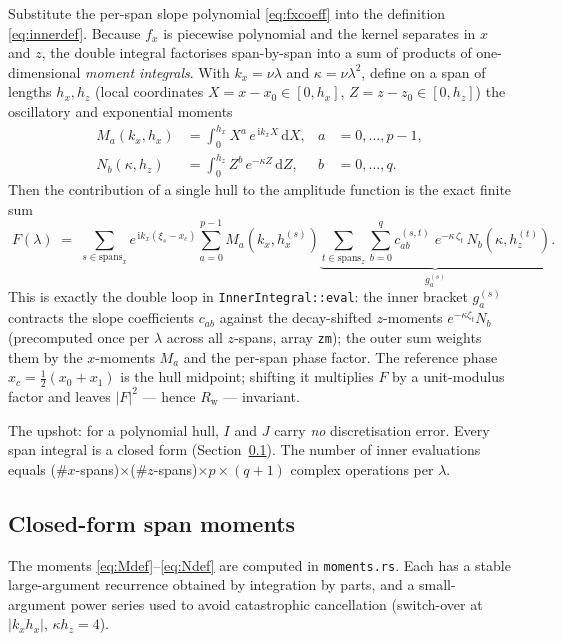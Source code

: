 \documentclass[11pt]{article}
\newcommand{\ii}{\mathrm{i}}
\newcommand{\dd}{\,\mathrm{d}}
\newcommand{\Rw}{R_{\mathrm{w}}}
\begin{document}
Substitute the per-span slope polynomial \eqref{eq:fxcoeff} into the definition
\eqref{eq:innerdef}. Because $f_x$ is piecewise polynomial and the kernel
separates in $x$ and $z$, the double integral factorises span-by-span into a
sum of products of one-dimensional \emph{moment integrals}. With
$k_x = \nu\lambda$ and $\kappa = \nu\lambda^{2}$, define on a span of lengths
$h_x, h_z$ (local coordinates $X = x-x_0 \in [0,h_x]$, $Z = z-z_0 \in [0,h_z]$)
the oscillatory and exponential moments
\begin{align}
  M_a(k_x, h_x) &= \int_{0}^{h_x} X^{a}\, e^{\,\ii k_x X}\dd X,
    &  a &= 0,\dots,p-1, \label{eq:Mdef}\\
  N_b(\kappa, h_z) &= \int_{0}^{h_z} Z^{b}\, e^{-\kappa Z}\dd Z,
    &  b &= 0,\dots,q. \label{eq:Ndef}
\end{align}
Then the contribution of a single hull to the amplitude function is the exact
finite sum
\begin{equation}
  \boxed{\;
  F(\lambda) \;=\;
    \sum_{s\in\text{spans}_x}
      e^{\,\ii k_x (\xi_{s} - x_c)}
      \sum_{a=0}^{p-1} M_a(k_x, h_x^{(s)})
      \underbrace{\sum_{t\in\text{spans}_z}\sum_{b=0}^{q}
        c_{ab}^{(s,t)}\;
        e^{-\kappa\,\zeta_{t}}\, N_b(\kappa, h_z^{(t)})}_{\textstyle g_a^{(s)}}.
  \;}
  \label{eq:Fexact}
\end{equation}
This is exactly the double loop in \texttt{InnerIntegral::eval}: the inner
bracket $g_a^{(s)}$ contracts the slope coefficients $c_{ab}$ against the
decay-shifted $z$-moments $e^{-\kappa\zeta_t} N_b$ (precomputed once per
$\lambda$ across all $z$-spans, array \texttt{zm}); the outer sum weights them by
the $x$-moments $M_a$ and the per-span phase factor. The reference phase
$x_c = \tfrac12(x_0 + x_1)$ is the hull midpoint; shifting it multiplies $F$ by a
unit-modulus factor and leaves $|F|^{2}$ --- hence $\Rw$ --- invariant.

The upshot: for a polynomial hull, $I$ and $J$ carry \emph{no} discretisation
error. Every span integral is a closed form (Section~\ref{sec:moments}). The
number of inner evaluations equals (\#$x$-spans)$\times$(\#$z$-spans)$\times
p\times(q{+}1)$ complex operations per $\lambda$.

\subsection{Closed-form span moments}
\label{sec:moments}

The moments \eqref{eq:Mdef}--\eqref{eq:Ndef} are computed in \texttt{moments.rs}.
Each has a stable large-argument recurrence obtained by integration by parts,
and a small-argument power series used to avoid catastrophic cancellation
(switch-over at $|k_x h_x|,\,\kappa h_z = 4$).
\end{document}
